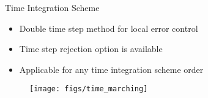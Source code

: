 \begin{frame}{Time Integration Scheme}

    \scriptsize

    \begin{block}{}
        \begin{itemize}
            \item Double time step method for local error control
            \item Time step rejection option is available
            \item Applicable for any time integration scheme order
        \end{itemize}
    \end{block}

    \begin{figure}[h]
        \texttt{[image: figs/time\_marching]}
    \end{figure}

\end{frame}